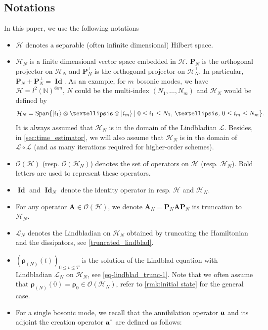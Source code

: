 \documentclass[a4paper,onecolumn,amsmath,amssymb,amsfonts,accepted=2026-03-06]{quantumarticle}
\newcommand{\xL}{\mathcal{L}}
\newcommand{\Id}{\operatorname{\mathbf{Id}}}
\newcommand{\xH}{\mathcal{H}}
\newcommand{\xN}{\mathbb{N}}
\newcommand{\Proj}[1]{\mathbf{P}_{#1}}
\newcommand{\destroy}{{\bf a}}
\newcommand{\create}{{\bf a^\dag}}
\newcommand{\rN}{{\boldsymbol{\rho}_{(N)}}}
\begin{document}
\subsection{Notations}
\label{subsec_notation}
In this paper, we use the following notations
\begin{itemize}
    \item $\xH$ denotes a separable (often infinite dimensional) Hilbert space.
    \item $\xH_N$ is a finite dimensional vector space embedded in $\xH$. $\Proj{N}$ is the orthogonal projector on $\xH_N$ and $\Proj{N}^\perp$ is the orthogonal projector on $\xH_N^\perp$. In particular, $\Proj{N}+\Proj{N}^\perp=\Id$. As an  example, for $m$ bosonic modes, we have $\xH= l^2(\xN)^{\otimes m}$, $N$ could be the multi-index $(N_1,\ldots,N_{m})$ and $\xH_N$ would be defined by
    \begin{align}
        \xH_N=\operatorname*{Span}\{ \ket{i_1}\otimes \ldots \otimes \ket{i_m}\mid 0\leq i_1 \leq N_1,\, \ldots,\, 0\leq i_m \leq N_m \}.
    \end{align}
    It is always assumed that $\xH_N$ is in the domain of the Lindbladian $\xL$. Besides, in \cref{sec:time_estimator}, we will also assume that  $\xH_N$ is in the domain of $\xL\circ \xL$ (and as many iterations required for higher-order schemes).
    \item $\mathcal{O}(\xH)$ (resp. $\mathcal{O}(\xH_N)$) denotes the set of operators on $\xH$ (resp. $\xH_N$). Bold letters are used to represent these operators.
    \item $\Id$ and $\Id_N$ denote the identity operator in resp. $\xH$ and $\xH_N$.
    \item For any operator $\mathbf{A}\in \mathcal{O}(\xH)$, we denote $\mathbf{A}_N=\Proj{N} \mathbf{A} \Proj{N}$ its truncation to $\xH_N$.
    \item $\xL_N$ denotes the Lindbladian on $\xH_N$ obtained by truncating the Hamiltonian and the dissipators, see \cref{truncated_lindblad}.
    \item $(\rN(t))_{0 \leq t \leq T}$ is the solution of the Lindblad equation with Lindbladian $\xL_N$ on $\xH_N$, see \cref{eq-lindblad_trunc-1}. Note that we often assume that $\rN(0)=\boldsymbol{\rho}_0\in \mathcal{O}(\xH_N)$, refer to \cref{rmk:initial state} for the general case.
    \item For a single bosonic mode, we recall that the annihilation operator $\destroy$ and its adjoint the creation operator $\create$ are defined as follows:
    \begin{align}

\end{align}
\end{itemize}
\end{document}
